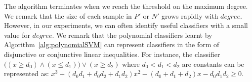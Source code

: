 The algorithm terminates when we reach the threshold on the maximum degree.
We remark that the size of each sample in $P'$ or $N'$ grows rapidly with $\mathit{degree}$. 
However, in our experiments, we can often identify useful classifiers with a small value for $\mathit{degree}$.
We remark that the polynomial classifiers learnt by Algorithm~\ref{alg:polynomialSVM} can represent classifiers in the form of disjunctive or conjunctive linear inequalities.
For instance, the classifier $\big((x \ge d_0) \wedge (x \le d_1)\big) \vee (x \ge d_2)$
where $\mathit{d_0 < d_1 < d_2}$ are constants can be represented as: $\mathit{x^3 + (d_0d_1 + d_0d_2 + d_1d_2)x^2 - (d_0 + d_1 + d_2)x - d_0d_1d_2 \geq 0}$.








